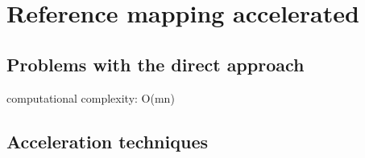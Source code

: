 
\chapter{Reference mapping accelerated}

\section{Problems with the direct approach}

computational complexity: O(mn)

\section{Acceleration techniques}